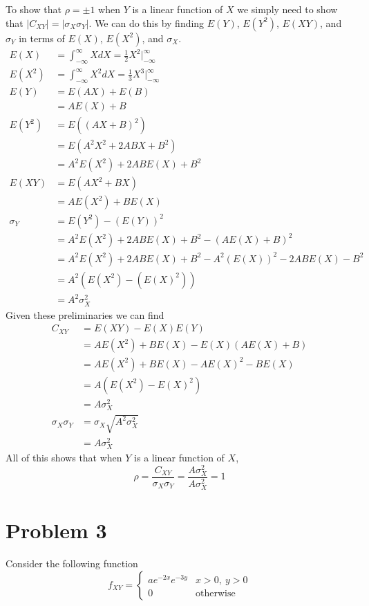 \documentclass[11pt]{article}
\begin{document}
\subparagraph*{}
To show that $\rho=\pm 1$ when $Y$ is a linear function of $X$ we simply need to show that $|C_{XY}|=|\sigma_X \sigma_Y|$. We can do this by finding $E(Y)$, $E(Y^2)$, $E(XY)$, and $\sigma_Y$ in terms of $E(X)$, $E(X^2)$, and $\sigma_X$.
\begin{align*}
	E(X) &= \int_{-\infty}^{\infty}XdX = \frac{1}{2}X^2\Big|_{-\infty}^{\infty} \\
	E(X^2) &= \int_{-\infty}^{\infty}X^2dX = \frac{1}{3}X^3\Big|_{-\infty}^{\infty} \\
	E(Y) &= E(AX) + E(B) \\
	&= AE(X) + B \\
	E(Y^2) &= E((AX+B)^2) \\
	&= E(A^2X^2 + 2ABX + B^2) \\
	&= A^2E(X^2) + 2ABE(X) + B^2 \\
	E(XY) &= E(AX^2+BX) \\
	&= AE(X^2)+BE(X) \\
	\sigma_Y &= E(Y^2)-(E(Y))^2 \\
	&= A^2E(X^2) + 2ABE(X) + B^2 - (AE(X)+B)^2 \\
	&= A^2E(X^2) + 2ABE(X) + B^2 - A^2(E(X))^2 -2ABE(X)-B^2 \\
	&= A^2(E(X^2)-(E(X)^2)) \\
	&= A^2\sigma_X^2
\end{align*}
Given these preliminaries we can find 
\begin{align*}
	C_{XY} &= E(XY)-E(X)E(Y) \\
	&= AE(X^2)+BE(X)-E(X)(AE(X)+B) \\
	&= AE(X^2)+BE(X)-AE(X)^2 - BE(X) \\
	&= A(E(X^2)-E(X)^2) \\
	&= A\sigma_X^2 \\
	\sigma_X\sigma_Y &= \sigma_X \sqrt{A^2\sigma_X^2} \\
	&= A\sigma_X^2
\end{align*} 
All of this shows that when $Y$ is a linear function of $X$,
\begin{equation*}
	\rho = \frac{C_{XY}}{\sigma_X \sigma_Y} = \frac{A\sigma_X^2}{A\sigma_X^2}=1
\end{equation*}

\section*{Problem 3}
Consider the following function
\begin{equation*}
	f_{XY}=\begin{cases} ae^{-2x}e^{-3y} & x>0,\ y>0 \\ 0 & \text{otherwise} \end{cases}
\end{equation*}
\end{document}
